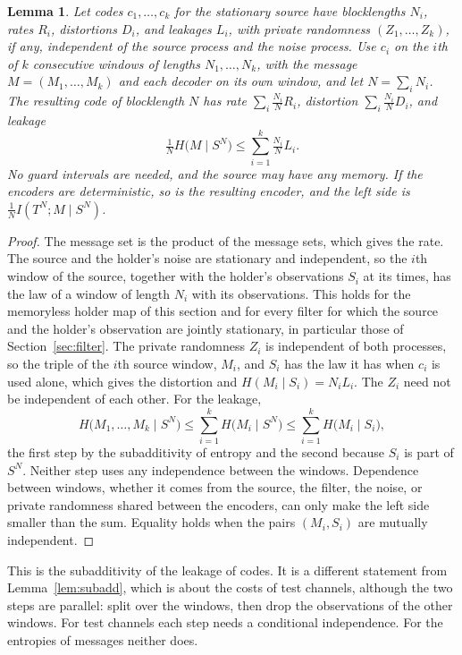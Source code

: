 \documentclass[11pt,onecolumn]{IEEEtran}
\newtheorem{lemma}[theorem]{Lemma}
\begin{document}
\begin{lemma}\label{lem:concat}
Let codes $c_1,\dots,c_k$ for the stationary source have blocklengths
$N_i$, rates $R_i$, distortions $D_i$, and leakages $L_i$, with private
randomness $(Z_1,\dots,Z_k)$, if any, independent of the source process
and the noise process. Use $c_i$ on the $i$th of $k$
consecutive windows of lengths $N_1,\dots,N_k$, with the message
$M=(M_1,\dots,M_k)$ and each decoder on its own window, and let
$N=\sum_iN_i$. The resulting code of blocklength $N$ has rate
$\sum_i\tfrac{N_i}NR_i$, distortion $\sum_i\tfrac{N_i}ND_i$, and leakage
\[
\tfrac1NH\bigl(M\mid S^N\bigr)\le\sum_{i=1}^k\tfrac{N_i}NL_i .
\]
No guard intervals are needed, and the source may have any memory. If
the encoders are deterministic, so is the resulting encoder, and the
left side is $\tfrac1NI(T^N;M\mid S^N)$.
\end{lemma}

\begin{proof}
The message set is the product of the message sets, which gives the
rate. The source and the holder's noise are stationary and independent,
so the $i$th window of the source, together with the holder's
observations $S_i$ at its times, has the law of a window of length
$N_i$ with its observations. This holds for the memoryless holder map
of this section and for every filter for which the source and the
holder's observation are jointly stationary, in particular those of
Section~\ref{sec:filter}. The
private randomness $Z_i$ is independent of both processes, so the
triple of the $i$th source window, $M_i$, and $S_i$ has the law it has
when $c_i$ is used alone, which gives the distortion and
$H(M_i\mid S_i)=N_iL_i$. The $Z_i$ need not be independent of each other.
For the leakage,
\[
H\bigl(M_1,\dots,M_k\mid S^N\bigr)\le\sum_{i=1}^kH\bigl(M_i\mid S^N\bigr)
\le\sum_{i=1}^kH\bigl(M_i\mid S_i\bigr),
\]
the first step by the subadditivity of entropy and the second because
$S_i$ is part of $S^N$. Neither step uses any independence between
the windows. Dependence between windows, whether it comes from the
source, the filter, the noise, or private randomness shared between
the encoders, can only make the left side smaller than the sum.
Equality holds when the pairs $(M_i,S_i)$ are mutually independent.
\end{proof}

This is the subadditivity of the leakage of codes. It is a different
statement from Lemma~\ref{lem:subadd}, which is about the costs of test
channels, although the two steps are parallel: split over the windows,
then drop the observations of the other windows. For test channels
each step needs a conditional independence. For the entropies of
messages neither does.
\end{document}
